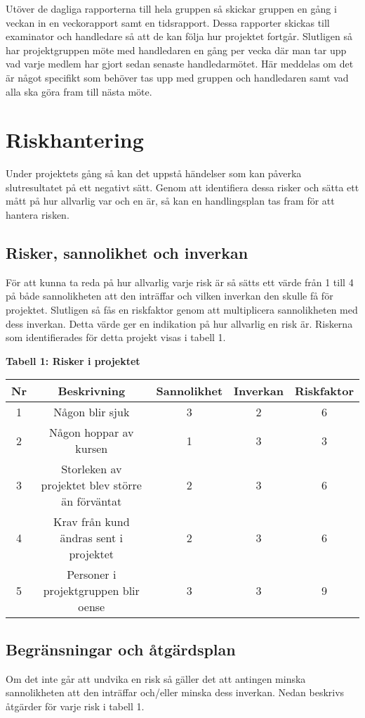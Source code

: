\documentclass[a4paper,10pt]{article}
\begin{document}
Utöver de dagliga rapporterna till hela gruppen så skickar gruppen en gång i veckan in en veckorapport samt en tidsrapport. Dessa rapporter skickas till examinator och handledare så att de kan följa hur projektet fortgår.
Slutligen så har projektgruppen möte med handledaren en gång per vecka där man tar upp vad varje medlem har gjort sedan senaste handledarmötet. Här meddelas om det är något specifikt som behöver tas upp med gruppen och handledaren samt vad alla ska göra fram till nästa möte.
\section{Riskhantering}
Under projektets gång så kan det uppstå händelser som kan påverka slutresultatet på ett negativt sätt. Genom att identifiera dessa risker och sätta ett mått på hur allvarlig var och en  är, så kan en handlingsplan tas fram för att hantera risken.
\subsection{Risker, sannolikhet och inverkan}
För att kunna ta reda på hur allvarlig varje risk är så sätts ett värde från 1 till 4 på både sannolikheten att den inträffar och vilken inverkan den skulle få för projektet. Slutligen så fås en riskfaktor genom att  multiplicera sannolikheten med dess inverkan. Detta värde ger en indikation på hur allvarlig en risk är. Riskerna som identifierades för detta projekt visas i tabell 1.

\textbf{Tabell 1: Risker i projektet}\\
\begin{tabular}{|c c c c c|}
 \hline
 Nr & Beskrivning & Sannolikhet & Inverkan & Riskfaktor\\
 \hline
 1 & Någon blir sjuk & 3 & 2 & 6\\
 2 & Någon hoppar av kursen & 1 & 3 & 3\\
 3 & Storleken av projektet blev större än förväntat & 2 & 3 & 6\\
 4 & Krav från kund ändras sent i projektet & 2 & 3 & 6\\
 5 & Personer i projektgruppen blir oense & 3 & 3 & 9\\
 \hline
\end{tabular}
\subsection{Begränsningar och åtgärdsplan}
Om det inte går att undvika en risk så gäller det att antingen minska sannolikheten att den inträffar och/eller minska dess inverkan. Nedan beskrivs åtgärder för varje risk i tabell 1.
\end{document}
